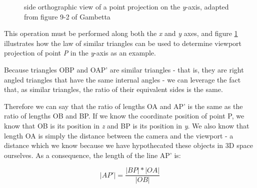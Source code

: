 \documentclass{article}
\begin{document}
\begin{figure}
   \centering
   \caption{side orthographic view of a point projection on the \textit{y}-axis, adapted from figure 9-2 of Gambetta
   \cite[p. 106]{gambetta}}
   \label{fig:triangles}
\end{figure}

This operation must be performed along both the \textit{x} and \textit{y} axes, and figure \ref{fig:triangles}
illustrates how the law of similar triangles can be used to determine viewport projection of point \textit{P}
in the \textit{y}-axis as an example. \cite[p. 106]{gambetta}

Because triangles OBP and OAP' are similar triangles - that is, they are right angled triangles that have the same
internal angles - we can leverage the fact that, as similar triangles, the ratio of their equivalent sides is the same.

Therefore we can say that the ratio of lengths OA and AP' is the same as the ratio of lengths OB and BP. If we know
the coordinate position of point P, we know that OB is its position in \textit{z} and BP is its position in \textit{y}.
We also know that length OA is simply the distance between the camera and the viewport - a distance which we know because
we have hypothecated these objects in 3D space ourselves. As a consequence, the length of the line AP' is:

\begin{equation}
   |AP'| = \frac{|BP| * |OA|} {|OB|}
\end{equation}
\end{document}
